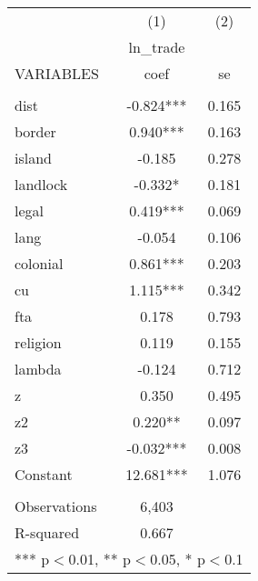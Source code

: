 \documentclass[]{article}
\begin{document}
\begin{tabular}{lcc} \hline
 & (1) & (2) \\
 & ln\_trade &  \\
VARIABLES & coef & se \\ \hline
 &  &  \\
dist & -0.824*** & 0.165 \\
border & 0.940*** & 0.163 \\
island & -0.185 & 0.278 \\
landlock & -0.332* & 0.181 \\
legal & 0.419*** & 0.069 \\
lang & -0.054 & 0.106 \\
colonial & 0.861*** & 0.203 \\
cu & 1.115*** & 0.342 \\
fta & 0.178 & 0.793 \\
religion & 0.119 & 0.155 \\
lambda & -0.124 & 0.712 \\
z & 0.350 & 0.495 \\
z2 & 0.220** & 0.097 \\
z3 & -0.032*** & 0.008 \\
Constant & 12.681*** & 1.076 \\
 &  &  \\
Observations & 6,403 &  \\
 R-squared & 0.667 &  \\ \hline
\multicolumn{3}{c}{ *** p$<$0.01, ** p$<$0.05, * p$<$0.1} \\
\end{tabular}
\end{document}
